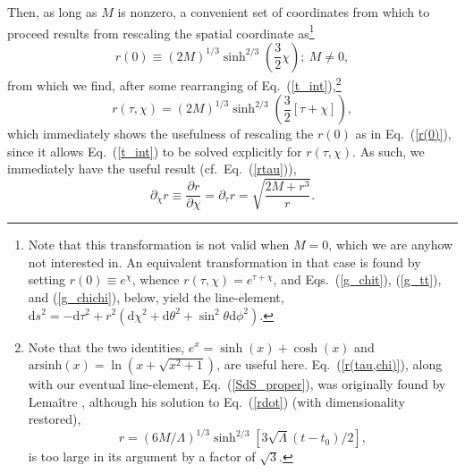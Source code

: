 \documentclass[11pt]{article}
\begin{document}
\begin{appendix}
Then, as long as $M$ is nonzero, a convenient set of coordinates from which to proceed results from rescaling the spatial coordinate as\footnote{Note that this transformation is not valid when $M=0$, which we are anyhow not interested in. An equivalent transformation in that case is found by setting $r(0)\equiv{e}^{\chi}$, whence $r(\tau,\chi)=e^{\tau+\chi}$, and Eqs.~(\ref{g_chit}), (\ref{g_tt}), and (\ref{g_chichi}), below, yield the line-element, $\mathrm{d}s^2=-\mathrm{d}\tau^2+r^2\left(\mathrm{d}\chi^2+\mathrm{d}\theta^2+\sin^2\theta{\mathrm{d}\phi^2}\right)$.} 
\begin{equation}
r(0)\equiv(2M)^{1/3}\sinh^{2/3}\left(\frac{3}{2}\chi\right) ;~M\neq0, \label{r(0)}
\end{equation}
from which we find, after some rearranging of Eq.~(\ref{t_int}),\footnote{Note that the two identities, $e^x=\sinh(x)+\cosh(x)$ and $\mathrm{arsinh}(x)=\ln\left(x+\sqrt{x^2+1}\right)$, are useful here. Eq.~(\ref{r(tau,chi)}), along with our eventual line-element, Eq.~(\ref{SdS_proper}), was originally found by Lema\^{i}tre \cite{Lemaitre1949}, although his solution to Eq.~(\ref{rdot}) (with dimensionality restored),
\[r=(6M/\Lambda)^{1/3}\sinh^{2/3}\left[3\sqrt{\Lambda}(t-t_0)/2\right],\]
is too large in its argument by a factor of $\sqrt{3}$.}
\begin{equation}
r(\tau,\chi)=(2M)^{1/3}\sinh^{2/3}\left(\frac{3}{2}[\tau+\chi]\right),\label{r(tau,chi)}
\end{equation}
which immediately shows the usefulness of rescaling the $r(0)$ as in Eq.~(\ref{r(0)}), since it allows Eq.~(\ref{t_int}) to be solved explicitly for $r(\tau,\chi)$. As such, we immediately have the useful result (cf.\ Eq.~(\ref{rtau})),
\begin{equation}
\partial_{\chi}r\equiv\frac{\partial{r}}{\partial\chi}=\partial_{\tau}r=\sqrt{\frac{2M+r^3}{r}}.\label{rprime}
\end{equation}


\end{appendix}
\end{document}
